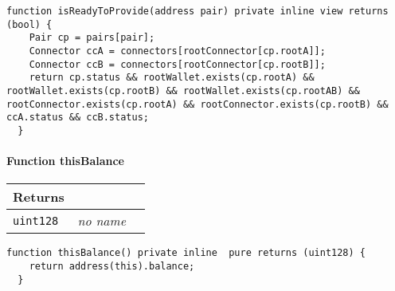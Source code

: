 \vspace{2cm}

\begin{lstlisting}[firstnumber=206]
  function isReadyToProvide(address pair) private inline view returns (bool) {
    Pair cp = pairs[pair];
    Connector ccA = connectors[rootConnector[cp.rootA]];
    Connector ccB = connectors[rootConnector[cp.rootB]];
    return cp.status && rootWallet.exists(cp.rootA) && rootWallet.exists(cp.rootB) && rootWallet.exists(cp.rootAB) && rootConnector.exists(cp.rootA) && rootConnector.exists(cp.rootB) && ccA.status && ccB.status;
  }
\end{lstlisting}

\paragraph{Function thisBalance}


\ifsoltables
\noindent\begin{tabular}{|l|l|p{5cm}|}\hline
\multicolumn{3}{|l|}{\bf Returns}\\\hline
\tt uint128 & {\em no name} &\\\hline
\end{tabular}
\fi

\vspace{2cm}

\begin{lstlisting}[firstnumber=346]
  function thisBalance() private inline  pure returns (uint128) {
    return address(this).balance;
  }
\end{lstlisting}

